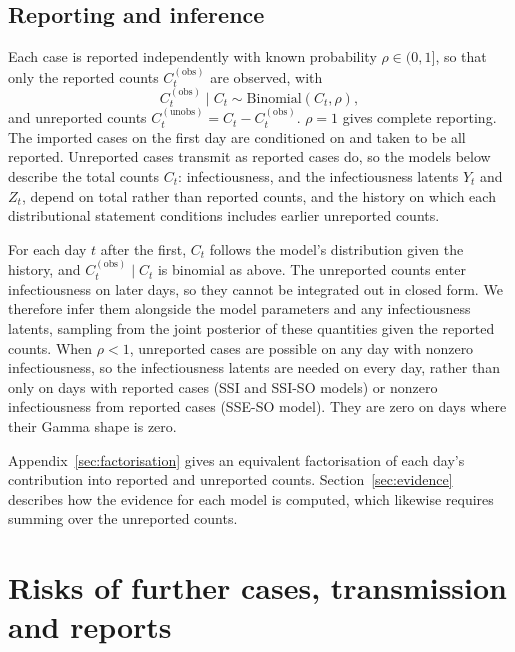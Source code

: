 \documentclass{article}
\newcommand{\BinomialDist}[2]{\mathrm{Binomial}\left(#1, #2\right)}
\begin{document}
\subsection{Reporting and inference}
\label{sec:reporting}

Each case is reported independently with known probability
\(\rho\in(0,1]\), so that only the reported counts
\(C_t^{(\mathrm{obs})}\) are observed, with
\begin{equation}
  C_t^{(\mathrm{obs})}\mid C_t \sim \BinomialDist{C_t}{\rho},
\end{equation}
and unreported counts \(C_t^{(\mathrm{unobs})}=C_t-C_t^{(\mathrm{obs})}\).
\(\rho=1\) gives complete reporting. The imported cases on the first day
are conditioned on and taken to be all reported. Unreported cases transmit
as reported cases do, so the models below describe the total counts
\(C_t\): infectiousness, and the infectiousness latents \(Y_t\) and
\(Z_t\), depend on total rather than reported counts, and the history on
which each distributional statement conditions includes earlier unreported
counts.

For each day \(t\) after the first, \(C_t\) follows the model's
distribution given the history, and \(C_t^{(\mathrm{obs})}\mid C_t\) is
binomial as above. The unreported counts enter infectiousness on later days,
so they cannot be integrated out in closed form. We therefore infer them
alongside the model parameters and any infectiousness latents, sampling
from the joint posterior of these quantities given the reported counts.
When \(\rho<1\), unreported cases are possible on any day with nonzero
infectiousness, so the infectiousness latents are needed on every day,
rather than only on days with reported cases (SSI and SSI-SO models) or
nonzero infectiousness from reported cases (SSE-SO model). They are zero on
days where their Gamma shape is zero.

Appendix~\ref{sec:factorisation} gives an equivalent factorisation of each
day's contribution into reported and unreported counts.
Section~\ref{sec:evidence} describes how the evidence for each model is
computed, which likewise requires summing over the unreported counts.

\section{Risks of further cases, transmission and reports}
\label{sec:risks}
\end{document}
